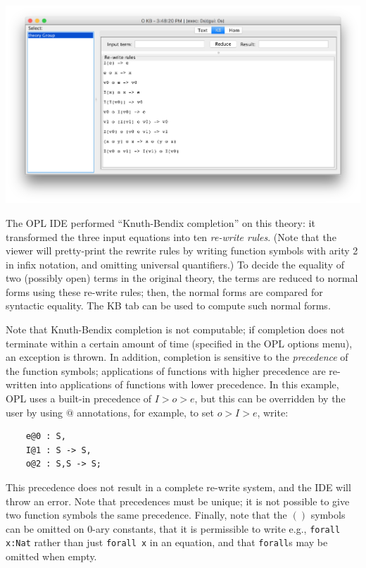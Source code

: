 \documentclass[12pt]{article}
\begin{document}
\begin{center}
\includegraphics[width=6in]{group1}
\end{center}

The OPL IDE performed ``Knuth-Bendix completion'' on this theory: it transformed the three input equations into ten {\it re-write rules}.  (Note that the viewer will pretty-print the rewrite rules by writing function symbols with arity 2 in infix notation, and omitting universal quantifiers.) To decide the equality of two (possibly open) terms in the original theory, the terms are reduced to normal forms using these re-write rules; then, the normal forms are compared for syntactic equality.  The KB tab can be used to compute such normal forms.

Note that Knuth-Bendix completion is not computable; if completion does not terminate within a certain amount of time (specified in the OPL options menu), an exception is thrown.  In addition, completion is sensitive to the {\it precedence} of the function symbols; applications of functions with higher precedence are re-written into applications of functions with lower precedence.  In this example, OPL uses a built-in precedence of $I > o > e$, but this can be overridden by the user by using $@$ annotations, for example, to set $o > I > e$, write:
\begin{verbatim}
	e@0 : S,
	I@1 : S -> S,
	o@2 : S,S -> S;
\end{verbatim}	
This precedence does not result in a complete re-write system, and the IDE will throw an error.  Note that precedences must be unique; it is not possible to give two function symbols the same precedence.  Finally, note that the $()$ symbols can be omitted on 0-ary constants, that it is permissible to write e.g., {\tt forall x:Nat} rather than just {\tt forall x} in an equation, and that {\tt forall}s may be omitted when empty.
\end{document}
